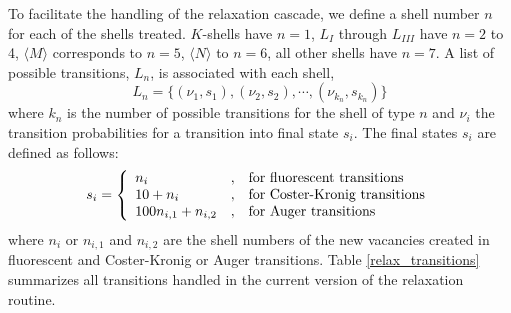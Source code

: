 To facilitate the handling of the relaxation cascade, we 
define a shell number $n$ for each of the shells treated. 
$K$-shells have $n=1$, $L_I$ through $L_{III}$ have $n=2$ to 4, 
$\langle M \rangle$ corresponds to $n=5$, $\langle N \rangle$ to 
$n=6$, all other shells have $n=7$. A list of possible 
transitions, $L_n$, is associated with each shell, 
\begin{equation}
L_n = \{ (\nu_1, s_1), (\nu_2, s_2), \cdots, (\nu_{k_n}, s_{k_n}) \}
\end{equation}
where $k_n$ is the number of possible transitions for the shell 
of type $n$ and $\nu_i$ the transition probabilities for 
a transition into final state $s_i$.  The final states 
$s_i$ are defined as follows:
\begin{equation}
s_i = 
\left\{
\begin{array}{l@{\quad , \quad}l}
n_i & \mbox{for fluorescent transitions} \\
10 + n_i & \mbox{for Coster-Kronig transitions} \\
100 n_{i,1} + n_{i,2} & \mbox{for Auger transitions}
\end{array}
\right.
\end{equation}
where $n_i$ or $n_{i,1}$ and $n_{i,2}$ are the shell numbers of the 
new vacancies created in fluorescent and Coster-Kronig or Auger transitions. 
Table \ref{relax_transitions} 
summarizes all transitions handled in the current version 
of the relaxation routine.
